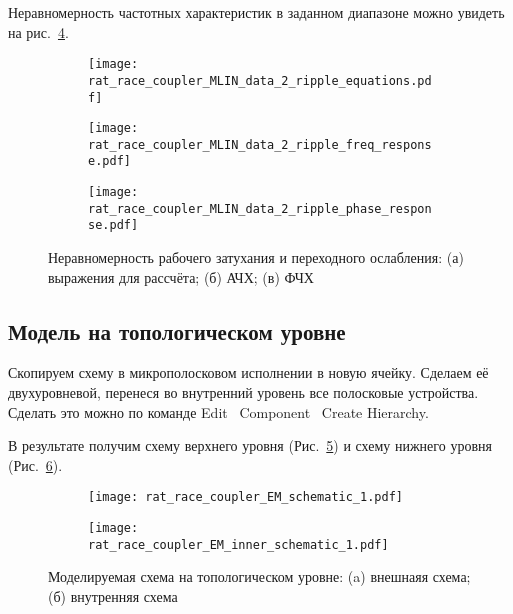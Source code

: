 Неравномерность частотных характеристик в заданном диапазоне можно увидеть на рис.~\ref{fig:rat_race_coupler_MLIN_data_2_response_ripple}.

\begin{figure}[!ht]
    \centering
    \begin{subfigure}[b]{0.25\textwidth}
        \centering
        \texttt{[image: rat\_race\_coupler\_MLIN\_data\_2\_ripple\_equations.pdf]}
        \caption{}%
    \label{fig:rat_race_coupler_MLIN_data_2_ripple_equations}
    \end{subfigure}
    \vfill
    \begin{subfigure}[b]{0.40\textwidth}
        \centering
        \texttt{[image: rat\_race\_coupler\_MLIN\_data\_2\_ripple\_freq\_response.pdf]}
        \caption{}%
    \label{fig:rat_race_coupler_MLIN_data_2_ripple_freq_response}
    \end{subfigure}
    \hfill
    \begin{subfigure}[b]{0.50\textwidth}
        \centering
        \texttt{[image: rat\_race\_coupler\_MLIN\_data\_2\_ripple\_phase\_response.pdf]}
        \caption{}%
    \label{fig:rat_race_coupler_MLIN_data_2_ripple_phase_response}
    \end{subfigure}
    \caption{%
        Неравномерность рабочего затухания и переходного ослабления:
        (а) выражения для рассчёта;
        (б) АЧХ;
        (в) ФЧХ
    }%
    \label{fig:rat_race_coupler_MLIN_data_2_response_ripple}
\end{figure}

\subsection{Модель на топологическом уровне}

Скопируем схему в микрополосковом исполнении в новую ячейку. Сделаем её двухуровневой, перенеся во внутренний уровень все полосковые устройства. Сделать это можно по команде Edit \textrightarrow\ Component \textrightarrow\ Create Hierarchy.

В результате получим схему верхнего уровня (Рис.~\ref{fig:rat_race_coupler_EM_schematic}) и схему нижнего уровня (Рис.~\ref{fig:rat_race_coupler_EM_inner_schematic}).

\begin{figure}[!ht]
    \centering
    \begin{subfigure}[b]{0.45\textwidth}
        \centering
        \texttt{[image: rat\_race\_coupler\_EM\_schematic\_1.pdf]}
        \caption{}%
    \label{fig:rat_race_coupler_EM_schematic}
    \end{subfigure}
    \hfill
    \begin{subfigure}[b]{0.45\textwidth}
        \centering
        \texttt{[image: rat\_race\_coupler\_EM\_inner\_schematic\_1.pdf]}
        \caption{}%
    \label{fig:rat_race_coupler_EM_inner_schematic}
    \end{subfigure}
    \caption{%
        Моделируемая схема на топологическом уровне:
        (a) внешнаяя схема;
        (б) внутренняя схема
    }%
    \label{fig:rat_race_coupler_EM_schematics}
\end{figure}

